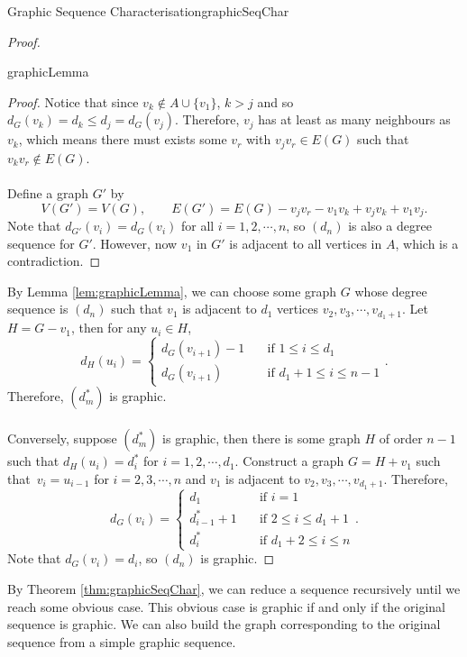\documentclass[math]{amznotes}
\theoremstyle{remark}
\begin{document}
\begin{thmbox}{Graphic Sequence Characterisation}{graphicSeqChar}
\begin{proof}
\begin{lembox}{}{graphicLemma}
\begin{proof}
                Notice that since $v_k \notin A \cup \{v_1\}$, $k > j$ and so $d_G(v_k) = d_k \leq d_j = d_G(v_j)$. Therefore, $v_j$ has at least as many neighbours as $v_k$, which means there must exists some $v_r$ with $v_jv_r \in E(G)$ such that $v_kv_r \notin E(G)$.
                \\\\
                Define a graph $G'$ by
                \begin{equation*}
                    V(G') = V(G), \qquad E(G') = E(G) - v_jv_r - v_1v_k + v_jv_k + v_1v_j.
                \end{equation*}
                Note that $d_{G'}(v_i) = d_G(v_i)$ for all $i = 1, 2, \cdots, n$, so $(d_n)$ is also a degree sequence for $G'$. However, now $v_1$ in $G'$ is adjacent to all vertices in $A$, which is a contradiction.
            \end{proof}
        \end{lembox}
        By Lemma \ref{lem:graphicLemma}, we can choose some graph $G$ whose degree sequence is $(d_n)$ such that $v_1$ is adjacent to $d_1$ vertices $v_2, v_3, \cdots, v_{d_1 + 1}$. Let $H = G - v_1$, then for any $u_i \in H$,
        \begin{equation*}
            d_H(u_i) = \begin{cases}
                d_G(v_{i + 1}) - 1 & \quad\textrm{if } 1 \leq i \leq d_1 \\
                d_G(v_{i + 1}) & \quad\textrm{if } d_1 + 1 \leq i \leq n - 1
            \end{cases}.
        \end{equation*}
        Therefore, $\left(d^*_m\right)$ is graphic.
        \\\\
        Conversely, suppose $\left(d^*_m\right)$ is graphic, then there is some graph $H$ of order $n - 1$ such that $d_H(u_i) = d^*_i$ for $i = 1, 2, \cdots, d_1$. Construct a graph $G = H + v_1$ such that~$v_i = u_{i - 1}$ for $i = 2, 3, \cdots, n$ and $v_1$ is adjacent to $v_2, v_3, \cdots, v_{d_1 + 1}$. Therefore,
        \begin{equation*}
            d_G(v_i) = \begin{cases}
                d_1 & \quad\textrm{if } i = 1 \\
                d^*_{i - 1} + 1 & \quad\textrm{if } 2 \leq i \leq d_1 + 1 \\
                d^*_{i} & \quad\textrm{if } d_1 + 2 \leq i \leq n
            \end{cases}.
        \end{equation*}
        Note that $d_G(v_i) = d_i$, so $(d_n)$ is graphic.
    \end{proof}
\end{thmbox}
By Theorem \ref{thm:graphicSeqChar}, we can reduce a sequence recursively until we reach some obvious case. This obvious case is graphic if and only if the original sequence is graphic. We can also build the graph corresponding to the original sequence from a simple graphic sequence.
\end{document}
